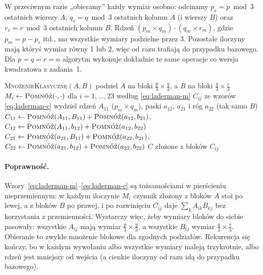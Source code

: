 W przeciwnym razie „obieramy'' każdy wymiar osobno: odcinamy $p_s=p\bmod3$ ostatnich wierszy $A$, $q_s=q\bmod3$
ostatnich kolumn $A$ (i wierszy $B$) oraz $r_s=r\bmod3$ ostatnich kolumn $B$. Rdzeń
$(p_m\times q_m)\cdot(q_m\times r_m)$, gdzie $p_m=p-p_s$ itd., ma wszystkie wymiary podzielne przez 3. Pozostałe
iloczyny mają któryś wymiar równy 1 lub 2, więc od razu trafiają do przypadku bazowego. Dla $p=q=r=n$ algorytm
wykonuje dokładnie te same operacje co wersja kwadratowa z zadania~1.

\begin{algorithm}[H]
\caption{Rekurencyjne mnożenie macierzy prostokątnych metodą Ladermana}
\begin{algorithmic}[1]
 
    \State \Return \textsc{MnożenieKlasyczne}$(A,B)$
  \EndIf
    \State podziel $A$ na bloki $\frac p3\times\frac q3$, a $B$ na bloki $\frac q3\times\frac r3$
    \State $M_i\gets\Pomnoz(\cdot,\cdot)$ dla $i=1,\dots,23$ według \eqref{eq:laderman-m}
    \State $C_{ij}$ ze wzorów \eqref{eq:laderman-c}
  \Else
    \State wydziel rdzeń $A_{11}$ ($p_m{\times}q_m$), paski $a_{12}$, $a_{21}$ i róg $a_{22}$ (tak samo $B$)
    \State $C_{11}\gets \Pomnoz(A_{11},B_{11})+\Pomnoz(a_{12},b_{21})$, \;
           $C_{12}\gets \Pomnoz(A_{11},b_{12})+\Pomnoz(a_{12},b_{22})$
    \State $C_{21}\gets \Pomnoz(a_{21},B_{11})+\Pomnoz(a_{22},b_{21})$, \;
           $C_{22}\gets \Pomnoz(a_{21},b_{12})+\Pomnoz(a_{22},b_{22})$
    \State {}
  \EndIf
  \State \Return $C$ złożone z bloków $C_{ij}$
\EndProcedure
\end{algorithmic}
\end{algorithm}

\paragraph{Poprawność.} Wzory~\eqref{eq:laderman-m}--\eqref{eq:laderman-c} są tożsamościami w pierścieniu
nieprzemiennym: w każdym iloczynie $M_i$ czynnik złożony z bloków $A$ stoi po lewej, a z bloków $B$ po prawej, i po
rozwinięciu $C_{ij}$ daje $\sum_k A_{ik}B_{kj}$ bez korzystania z przemienności. Wystarczy więc, żeby wymiary bloków
do siebie pasowały: wszystkie $A_{ij}$ mają wymiar $\frac p3\times\frac q3$, a wszystkie $B_{ij}$ wymiar
$\frac q3\times\frac r3$. Obieranie to zwykłe mnożenie blokowe dla zgodnych podziałów. Rekurencja się kończy, bo
w każdym wywołaniu albo wszystkie wymiary maleją trzykrotnie, albo rdzeń jest mniejszy od wejścia (a cienkie
iloczyny od razu idą do przypadku bazowego).

